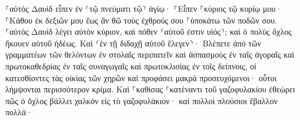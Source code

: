 \documentclass{openreader}
\begin{document}
⸀αὐτὸς Δαυὶδ εἶπεν ἐν ⸂τῷ πνεύματι τῷ⸃ ἁγίῳ· ⸀Εἶπεν ⸀κύριος τῷ κυρίῳ μου· ⸀Κάθου ἐκ δεξιῶν μου ἕως ἂν θῶ τοὺς ἐχθρούς σου ⸀ὑποκάτω τῶν ποδῶν σου. 
⸀αὐτὸς Δαυὶδ λέγει αὐτὸν κύριον, καὶ πόθεν ⸂αὐτοῦ ἐστιν υἱός⸃; καὶ ὁ πολὺς ὄχλος ἤκουεν αὐτοῦ ἡδέως. 
Καὶ ⸂ἐν τῇ διδαχῇ αὐτοῦ ἔλεγεν⸃· Βλέπετε ἀπὸ τῶν γραμματέων τῶν θελόντων ἐν στολαῖς περιπατεῖν καὶ ἀσπασμοὺς ἐν ταῖς ἀγοραῖς 
καὶ πρωτοκαθεδρίας ἐν ταῖς συναγωγαῖς καὶ πρωτοκλισίας ἐν τοῖς δείπνοις, 
οἱ κατεσθίοντες τὰς οἰκίας τῶν χηρῶν καὶ προφάσει μακρὰ προσευχόμενοι· οὗτοι λήμψονται περισσότερον κρίμα. 
Καὶ ⸀καθίσας ⸀κατέναντι τοῦ γαζοφυλακίου ἐθεώρει πῶς ὁ ὄχλος βάλλει χαλκὸν εἰς τὸ γαζοφυλάκιον· καὶ πολλοὶ πλούσιοι ἔβαλλον πολλά· 
\end{document}
